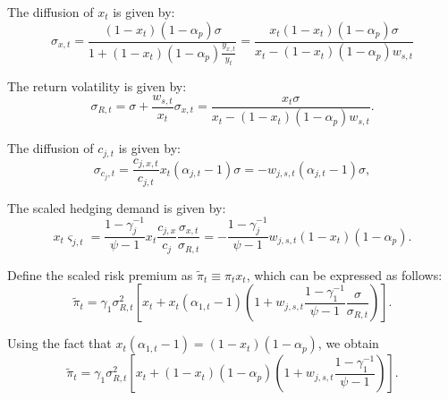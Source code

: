 \documentclass[11pt,english]{article}
\begin{document}
The diffusion of $x_t$ is given by:
\begin{equation}
    \sigma_{x,t} = \frac{(1-x_t)(1-\alpha_p) \sigma}{1+(1-x_t)(1-\alpha_p)  \frac{y_{x,t}}{y_t}} = \frac{x_t (1-x_t)(1-\alpha_p) \sigma}{x_t-(1-x_t)(1-\alpha_p)  w_{s,t}}
\end{equation}

The return volatility is given by:
\begin{equation}
    \sigma_{R,t} = \sigma + \frac{w_{s,t}}{x_t} \sigma_{x,t} = \frac{x_t  \sigma}{x_t-(1-x_t)(1-\alpha_p)  w_{s,t}}.
\end{equation}



The diffusion of $c_{j,t}$ is given by:
\begin{equation}
    \sigma_{c_j,t} = \frac{c_{j,x,t}}{c_{j,t}} x_t (\alpha_{j,t}-1) \sigma = -w_{j,s,t} (\alpha_{j,t}-1) \sigma,
\end{equation}

The scaled hedging demand is given by:
\begin{equation}
    x_t \varsigma_{j,t} = \frac{1-\gamma_j^{-1}}{\psi-1} x_t \frac{c_{j,x}}{c_{j}} \frac{\sigma_{x,t}}{\sigma_{R,t}} = -\frac{1-\gamma_j^{-1}}{\psi-1} w_{j,s,t} (1-x_t)(1-\alpha_p) .
\end{equation}

Define the scaled risk premium as $\tilde{\pi}_t \equiv \pi_t x_t$, which can be expressed as follows:
\begin{equation}
    \tilde{\pi}_t = \gamma_1 \sigma_{R,t}^2 \left[ x_t + x_t (\alpha_{1,t}-1) \left(1 + w_{j,s,t} \frac{1-\gamma_1^{-1}}{\psi-1} \frac{\sigma}{\sigma_{R,t}} \right)\right].
\end{equation}

Using the fact that $x_t (\alpha_{1,t}-1) = (1-x_t)(1 - \alpha_p) $, we obtain
\begin{equation}
    \tilde{\pi}_t = \gamma_1 \sigma_{R,t}^2 \left[ x_t + (1-x_t)(1 - \alpha_p) \left(1 + w_{j,s,t} \frac{1-\gamma_1^{-1}}{\psi-1}  \right)\right].
\end{equation}




    

\end{document}

